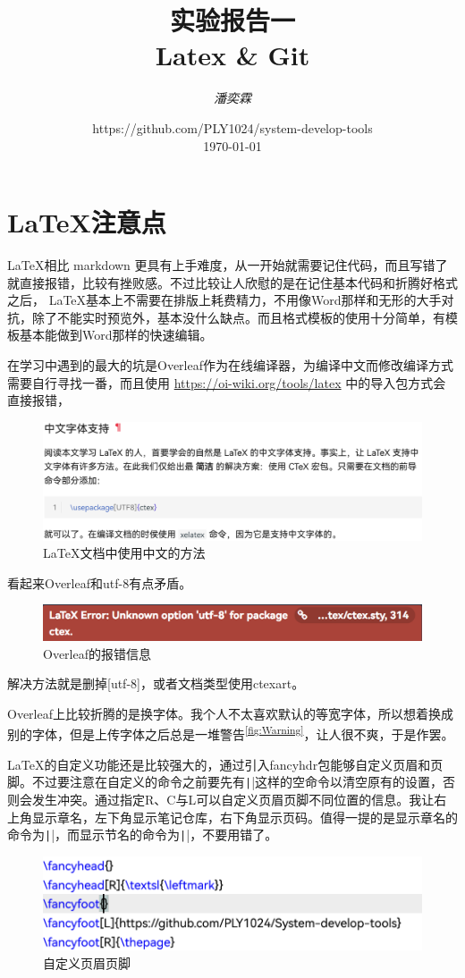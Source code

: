 \documentclass[fontset=ubuntu]{ctexart}
\title{\Huge \textbf{实验报告一\\ Latex{} \& Git}}
\author{\textit{潘奕霖}}
\date{https://github.com/PLY1024/system-develop-tools\\ \today}
\begin{document}
\maketitle
\newpage

\tableofcontents
\newpage

\section{ \LaTeX 注意点}
\LaTeX 相比 markdown 更具有上手难度，从一开始就需要记住代码，而且写错了就直接报错，比较有挫败感。不过比较让人欣慰的是在记住基本代码和折腾好格式之后， \LaTeX 基本上不需要在排版上耗费精力，不用像Word那样和无形的大手对抗，除了不能实时预览外，基本没什么缺点。而且格式模板的使用十分简单，有模板基本能做到Word那样的快速编辑。

在学习中遇到的最大的坑是Overleaf作为在线编译器，为编译中文而修改编译方式需要自行寻找一番，而且使用 \url{https://oi-wiki.org/tools/latex} 中的导入包方式会直接报错，
\begin{figure}[hbt]
    \centering
    \includegraphics[width=0.5\linewidth]{Chinese.png}
    \caption{ \LaTeX 文档中使用中文的方法}
    \label{fig:Chinese}
\end{figure}
看起来Overleaf和utf-8有点矛盾。
\begin{figure}[hbt]
    \centering
    \includegraphics[width=0.5\linewidth]{Error.png}
    \caption{Overleaf的报错信息}
    \label{fig:Error}
\end{figure}

解决方法就是删掉[utf-8]，或者文档类型使用ctexart。

Overleaf上比较折腾的是换字体。我个人不太喜欢默认的等宽字体，所以想着换成别的字体，但是上传字体之后总是一堆警告\textsuperscript{\ref{fig:Warning}}，让人很不爽，于是作罢。

\LaTeX 的自定义功能还是比较强大的，通过引入fancyhdr包能够自定义页眉和页脚。不过要注意在自定义的命令之前要先有\texttt|\fancyhead{}|这样的空命令以清空原有的设置，否则会发生冲突。通过指定R、C与L可以自定义页眉页脚不同位置的信息。我让右上角显示章名，左下角显示笔记仓库，右下角显示页码。值得一提的是显示章名的命令为\texttt|\leftmark|，而显示节名的命令为\texttt|\rightmark|，不要用错了。
\begin{figure}[htb]
    \centering
    \includegraphics[width=0.5\linewidth]{Custom.png}
    \caption{自定义页眉页脚}
    \label{fig:Custom}
\end{figure}
\end{document}
